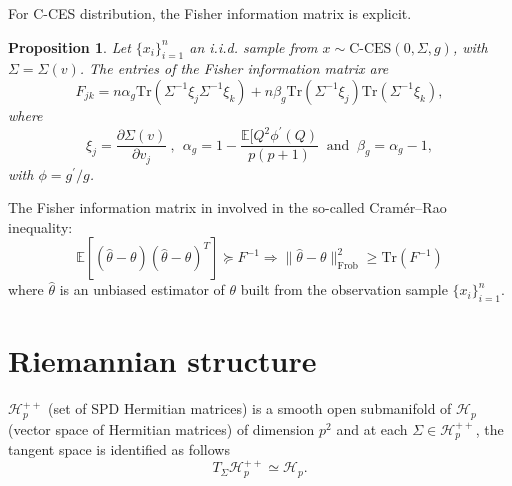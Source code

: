 \documentclass[10pt,a4paper]{book}
\theoremstyle{definition}
\theoremstyle{plain}
\newtheorem{prop}{Proposition}[section]
\theoremstyle{remark}
\newcommand \Esp {\mathbb{E}}
\begin{document}
For C-CES distribution, the Fisher information matrix is explicit.
\begin{prop}
Let $\{x_i\}_{i=1}^{n}$ an i.i.d. sample from $x\sim \text{C-CES}(0,\Sigma,g)$, with $\Sigma=\Sigma(v)$. The entries of the Fisher information matrix are
$$F_{jk}=n\alpha_g\text{Tr}(\Sigma^{-1}\xi_j\Sigma^{-1}\xi_k)+n\beta_g\text{Tr}(\Sigma^{-1}\xi_j)\text{Tr}(\Sigma^{-1}\xi_k),$$
where
$$\xi_j=\frac{\partial \Sigma(v)}{\partial v_j}~,~~\alpha_g=1-\frac{\Esp[Q^2\phi^{\prime}(Q)}{p(p+1)}~\text{ and }~\beta_g=\alpha_g-1,$$
with $\phi=g^{\prime}/g$.
\end{prop}
The Fisher information matrix in involved in the so-called Cramér--Rao inequality:
$$\Esp[(\hat{\theta}-\theta)(\hat{\theta}-\theta)^{T}]\succeq F^{-1} \Rightarrow \|\hat{\theta}-\theta\|^2_{\text{Frob}}\ge \text{Tr}(F^{-1})$$
where $\hat{\theta}$ is an unbiased estimator of $\theta$ built from the observation sample $\{x_i\}_{i=1}^{n}$. 
\section{Riemannian structure}
$\mathcal{H}^{++}_p$ (set of SPD Hermitian matrices) is a smooth open submanifold of $\mathcal{H}_p$ (vector space of Hermitian matrices) of dimension $p^2$ and at each $\Sigma \in \mathcal{H}_p^{++}$, the tangent space is identified as follows
$$T_{\Sigma}\mathcal{H}_p^{++}\simeq \mathcal{H}_p.$$
\end{document}
